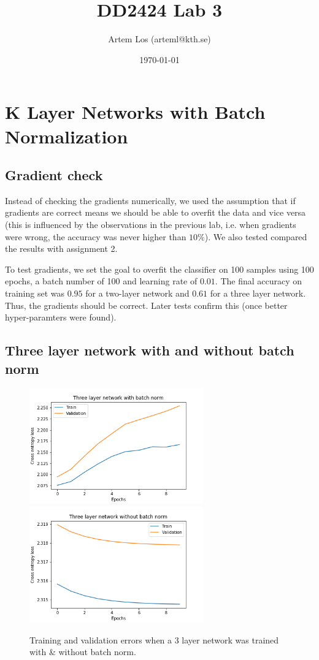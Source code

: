 \documentclass[10pt,a4paper]{article}
\title{DD2424 Lab 3}
\author{Artem Los (arteml@kth.se)}
\date{\today}
\begin{document}
\maketitle

\section*{K Layer Networks with Batch Normalization}

\subsection*{Gradient check}
Instead of checking the gradients numerically, we used the assumption that if gradients are correct means we should be able to overfit the data and vice versa (this is influenced by the observations in the previous lab, i.e. when gradients were wrong, the accuracy was never higher than $10\%$). We also tested compared the results with assignment 2.

To test gradients, we set the goal to overfit the classifier on 100 samples using 100 epochs, a batch number of 100 and learning rate of $0.01$. The final accuracy on training set was $0.95$ for a two-layer network and $0.61$ for a three layer network. Thus, the gradients should be correct. Later tests confirm this (once better hyper-paramters were found).

\subsection*{Three layer network with and without batch norm}

\begin{figure}[H]
	\includegraphics[width=7.5cm]{res/part2-with-bn.png}
	\includegraphics[width=7.5cm]{res/part2-without-bn.png}
	\caption{Training and validation errors when a 3 layer network was trained with \& without batch norm.}
\end{figure}
\end{document}
